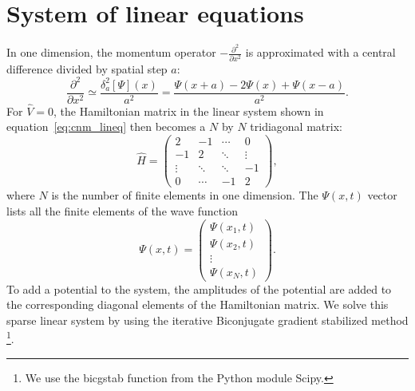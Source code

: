 
\section*{System of linear equations}
In one dimension, the momentum operator $-\frac{\partial^2}{\partial x^2}$ is approximated with a central difference divided by spatial step $a$:
\[
    \frac{\partial^2}{\partial x^2}
    \simeq \frac{\delta_a^2[\Psi](x)}{a^2} 
    = \frac{\Psi(x+a)-2\Psi(x)+\Psi(x-a)}{a^2}.
\]For $\hat{V}=0$, the Hamiltonian matrix in the linear system shown in equation~\ref{eq:cnm_lineq} then becomes a $N$ by $N$ tridiagonal matrix:
\[
\hat{H} =
 \begin{pmatrix}
    2       & -1     & \cdots & 0       \\
    -1      & 2      & \ddots & \vdots  \\
    \vdots  & \ddots & \ddots & -1      \\
    0       & \cdots & -1     & 2
 \end{pmatrix},
 \] where $N$ is the number of finite elements in one dimension. The $\Psi(x,t)$ vector lists all the finite elements of the wave function
 \[
\Psi(x,t) =
 \begin{pmatrix}
    \Psi(x_1,t)   \\
    \Psi(x_2,t)   \\
    \vdots      \\
    \Psi(x_N,t)
 \end{pmatrix}.
 \] To add a potential to the system, the amplitudes of the potential are added to the corresponding diagonal elements of the Hamiltonian matrix. We solve this sparse linear system by using the iterative Biconjugate gradient stabilized method \footnote{We use the bicgstab function from the Python module Scipy.}.
 
